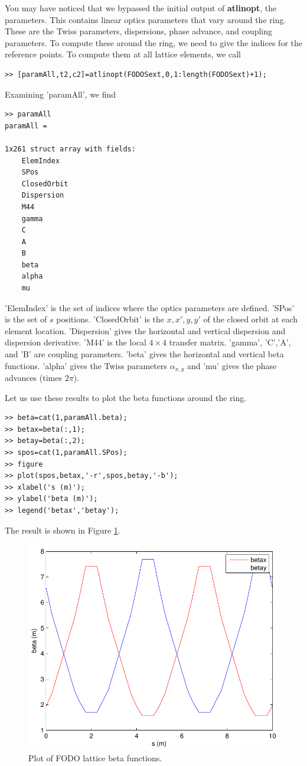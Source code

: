 \documentclass[acus]{article}
\newcommand{\mfun}[1]{{\bf{#1}}}
\begin{document}
You may have noticed that we bypassed the initial output of \mfun{atlinopt},
the parameters.  This contains linear optics parameters that vary around the ring.
These are the Twiss parameters, dispersions, phase advance, and coupling parameters.
To compute these around the ring, we need to give the indices for the reference points.
To compute them at all lattice elements, we call
\begin{verbatim}
>> [paramAll,t2,c2]=atlinopt(FODOSext,0,1:length(FODOSext)+1);
\end{verbatim}
Examining 'paramAll', we find
\begin{verbatim}
>> paramAll
paramAll = 

1x261 struct array with fields:
    ElemIndex
    SPos
    ClosedOrbit
    Dispersion
    M44
    gamma
    C
    A
    B
    beta
    alpha
    mu
\end{verbatim}
'ElemIndex' is the set of indices where the optics parameters are defined.  'SPos'
is the set of $s$ positions.  'ClosedOrbit' is the $x,x',y,y'$ of the closed orbit
at each element location.  'Dispersion' gives the horizontal and vertical dispersion
and dispersion derivative.  'M44' is the local $4\times 4$ transfer matrix.  'gamma',
'C','A', and 'B' are coupling parameters\cite{SaganRubinCoupling}. 'beta' gives the horizontal and vertical beta
functions. 'alpha' gives the Twiss parameters $\alpha_{x,y}$ and 'mu' gives the phase
advances (times $2\pi$).

Let us use these results to plot the beta functions around the ring.
\begin{verbatim}
>> beta=cat(1,paramAll.beta);
>> betax=beta(:,1);
>> betay=beta(:,2);
>> spos=cat(1,paramAll.SPos);
>> figure
>> plot(spos,betax,'-r',spos,betay,'-b');
>> xlabel('s (m)');
>> ylabel('beta (m)');
>> legend('betax','betay');
\end{verbatim}
The result is shown in Figure \ref{FODOBetaPlot}.
\begin{figure}[htb]
\centering
\includegraphics[scale=0.5]{FODOBetaplot.pdf}
\caption{Plot of FODO lattice beta functions.}
\label{FODOBetaPlot}
\end{figure}
\end{document}
